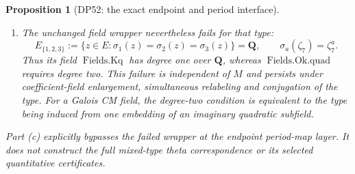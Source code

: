 \documentclass[11pt,a4paper]{article}
\newtheorem{proposition}[theorem]{Proposition}
\theoremstyle{definition}\newtheorem{remark}[theorem]{Remark}
\begin{document}
\begin{proposition}[DP52: the exact endpoint and period interface]
\begin{enumerate}[label=(\alph*),leftmargin=*]
\[
 \phi(\bar x)=\overline{\phi(x)}
       \quad(\phi:E\hookrightarrow\mathbf C),\qquad
 \sigma_0(\bar y)=\overline{\sigma_0(y)}
       \quad(y\in K),
\]
for one coefficient-field embedding $\sigma_0$, and
\[
 \operatorname{emb}_\tau(\bar x)
       =\overline{\operatorname{emb}_\tau(x)},
\]
together with the specified weight and endpoint-level inputs.
These assumptions hold for $E=K=\mathbf Q(\zeta_7)$,
$F=E^+$ and the actual type $\{1,2,3\}$.
Consequently that mixed type has the actual finite-class row/point spaces,
endpoint period and inner-product formula at every admissible rebuilt rank.
This assertion does not say that the period is nonzero on a prescribed
iterated theta image.
\item The unchanged field wrapper nevertheless fails for that type:
\[
 E_{\{1,2,3\}}
 :=\{z\in E:\sigma_1(z)=\sigma_2(z)=\sigma_3(z)\}
 =\mathbf Q,
 \qquad \sigma_a(\zeta_7)=\zeta_7^a.
\]
Thus its field $\operatorname{Fields.Kq}$ has degree one over $\mathbf Q$,
whereas $\operatorname{Fields.Ok.quad}$ requires degree two.
This failure is independent of $M$ and persists under coefficient-field
enlargement, simultaneous relabeling and conjugation of the type.
For a Galois CM field, the degree-two condition is equivalent to the type
being induced from one embedding of an imaginary quadratic subfield.
\end{enumerate}
Part (c) explicitly bypasses the failed wrapper at the endpoint period-map
layer. It does not construct the full mixed-type theta correspondence or
its selected quantitative certificates.
\end{proposition}
\end{document}

